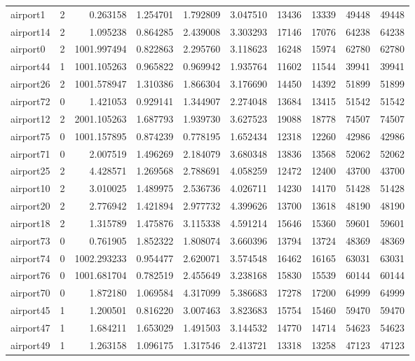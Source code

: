 \begin{longtable}{|l|r|r|r|r|r|r|r|r|r|}
airport1 & 2 & 0.263158 & 1.254701 & 1.792809 & 3.047510 & 13436 & 13339 & 49448 & 49448 \\
airport14 & 2 & 1.095238 & 0.864285 & 2.439008 & 3.303293 & 17146 & 17076 & 64238 & 64238 \\
airport0 & 2 & 1001.997494 & 0.822863 & 2.295760 & 3.118623 & 16248 & 15974 & 62780 & 62780 \\
airport44 & 1 & 1001.105263 & 0.965822 & 0.969942 & 1.935764 & 11602 & 11544 & 39941 & 39941 \\
airport26 & 2 & 1001.578947 & 1.310386 & 1.866304 & 3.176690 & 14450 & 14392 & 51899 & 51899 \\
airport72 & 0 & 1.421053 & 0.929141 & 1.344907 & 2.274048 & 13684 & 13415 & 51542 & 51542 \\
airport12 & 2 & 2001.105263 & 1.687793 & 1.939730 & 3.627523 & 19088 & 18778 & 74507 & 74507 \\
airport75 & 0 & 1001.157895 & 0.874239 & 0.778195 & 1.652434 & 12318 & 12260 & 42986 & 42986 \\
airport71 & 0 & 2.007519 & 1.496269 & 2.184079 & 3.680348 & 13836 & 13568 & 52062 & 52062 \\
airport25 & 2 & 4.428571 & 1.269568 & 2.788691 & 4.058259 & 12472 & 12400 & 43700 & 43700 \\
airport10 & 2 & 3.010025 & 1.489975 & 2.536736 & 4.026711 & 14230 & 14170 & 51428 & 51428 \\
airport20 & 2 & 2.776942 & 1.421894 & 2.977732 & 4.399626 & 13700 & 13618 & 48190 & 48190 \\
airport18 & 2 & 1.315789 & 1.475876 & 3.115338 & 4.591214 & 15646 & 15360 & 59601 & 59601 \\
airport73 & 0 & 0.761905 & 1.852322 & 1.808074 & 3.660396 & 13794 & 13724 & 48369 & 48369 \\
airport74 & 0 & 1002.293233 & 0.954477 & 2.620071 & 3.574548 & 16462 & 16165 & 63031 & 63031 \\
airport76 & 0 & 1001.681704 & 0.782519 & 2.455649 & 3.238168 & 15830 & 15539 & 60144 & 60144 \\
airport70 & 0 & 1.872180 & 1.069584 & 4.317099 & 5.386683 & 17278 & 17200 & 64999 & 64999 \\
airport45 & 1 & 1.200501 & 0.816220 & 3.007463 & 3.823683 & 15754 & 15460 & 59470 & 59470 \\
airport47 & 1 & 1.684211 & 1.653029 & 1.491503 & 3.144532 & 14770 & 14714 & 54623 & 54623 \\
airport49 & 1 & 1.263158 & 1.096175 & 1.317546 & 2.413721 & 13318 & 13258 & 47123 & 47123 \\

\end{longtable}
